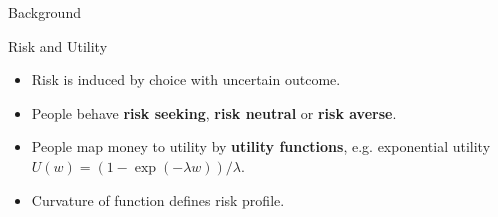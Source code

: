 \begin{exampleblock}{Background}

\Large{Risk and Utility}

\normalsize

\begin{itemize}
    \item Risk is induced by choice with uncertain outcome.
    \item People behave \textbf{risk seeking}, \textbf{risk neutral} or \textbf{risk averse}.
    \item People map money to utility by \textbf{utility functions}, e.g. exponential utility $U(w) = (1-\exp(-\lambda w)) / \lambda$. 
    \item Curvature of function defines risk profile.
\end{itemize}

\hspace{2cm}


\newlength{\twosubht}
\newsavebox{\twosubbox}


\begin{figure}[htp]


\end{figure}
\end{exampleblock}
